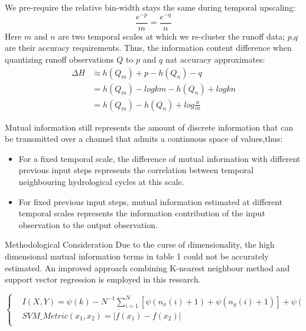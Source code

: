 \documentclass[final]{beamer}
\newlength{\onecolwid}
\begin{document}
\begin{frame}[t]
\begin{columns}[t]
\begin{column}{\onecolwid}
\begin{block}{}
\begin{figure}
\begin{minipage}{.48\linewidth}
\end{minipage}
\end{figure}
We pre-require the relative bin-width stays the same  during temporal upscaling:
\begin{equation*}
\frac{e^{-p}}{m}=\frac{e^{-q}}{n}
\end{equation*}
Here $m$ and $n$ are two temporal scales at which we re-cluster the runoff data; $p$,$q$ are their accuracy requirements. Thus, the information content difference when quantizing runoff observations $Q$ to $p$ and $q$ nat accuracy approximates:
\begin{equation*}
\begin{split}
\Delta H &\approx h(Q_m)+p-h(Q_n)-q\\
&=h(Q_m)-logkm-h(Q_n)+logkn\\
&=h(Q_m)-h(Q_n)+log\frac{n}{m} 
\end{split}
\end{equation*}

Mutual information still represents the amount of discrete information that can be transmitted over a channel that admits a continuous space of values\cite{cover2012elements},thus:
\begin{itemize}
\item For a fixed temporal scale, the difference of mutual information with different previous input steps represents the correlation between temporal neighbouring hydrological cycles at this scale\cite{gong2013estimating}. 
\item For fixed previous input steps, mutual information estimated at different temporal scales represents the information contribution of the input observation to the output observation.  
\end{itemize}
\end{block}
\begin{block}{Methodological Consideration}
Due to the curse of dimensionality, the high dimensional mutual information terms in table 1 could not be accurately estimated. An improved approach combining K-nearest neighbour method and support vector regression is employed in this research.

\begin{footnotesize}
 \begin{equation*}
\left\{
\begin{aligned}
&I(X,Y)=\psi(k)-N^{-1}\sum_{i=1}^{N}[\psi(n_x(i)+1)+\psi(n_y(i)+1)]+\psi(N)\\
&SVM\_Metric(x_1,x_2)=|f(x_1)-f(x_2)|\\
\end{aligned}
\right.
\end{equation*}
\end{footnotesize}




\end{block}
\end{column}
\end{columns}
\end{frame}
\end{document}
